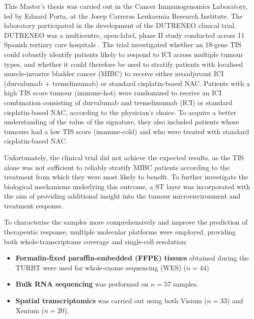 This Master's thesis was carried out in the Cancer Immunogenomics Laboratory, led by Eduard Porta, at the Josep Carreras Leukaemia Research Institute. The laboratory participated in the development of the DUTRENEO clinical trial\cite{Grande.et.al}. DUTRENEO was a multicentre, open-label, phase II study conducted across 11 Spanish tertiary care hospitals \cite{Grande.et.al}. The trial investigated whether an 18-gene TIS could robustly identify patients likely to respond to ICI across multiple tumour types, and whether it could therefore be used to stratify patients with localised muscle-invasive bladder cancer (MIBC) to receive either neoadjuvant ICI (durvalumab + tremelimumab) or standard cisplatin-based NAC. Patients with a high TIS score tumour (immune-hot) were randomized to receive an ICI combination consisting of durvalumab and tremelimumab (ICI) or standard cisplatin-based NAC, according to the physician's choice. To acquire a better understanding of the value of the signature, they also included patients whose tumours had a low TIS score (immune-cold) and who were treated with standard cisplatin-based NAC. 

Unfortunately, the clinical trial did not achieve the expected results, as the TIS alone was not sufficient to reliably stratify MIBC patients according to the treatment from which they were most likely to benefit. To further investigate the biological mechanisms underlying this outcome, a ST layer was incorporated with the aim of providing additional insight into the tumour microenvironment and treatment response.

To characterise the samples more comprehensively and improve the prediction of therapeutic response, multiple molecular platforms were employed, providing both whole-transcriptome coverage and single-cell resolution:

\begin{itemize}
	\item \textbf{Formalin-fixed paraffin-embedded (FFPE) tissues} obtained during the TURBT were used for whole-exome sequencing (WES) ($n = 44$)
	\item \textbf{Bulk RNA sequencing} was performed on $n = 57$ samples.
    \item \textbf{Spatial transcriptomics} was carried out using both Visium ($n = 33$) and Xenium ($n = 20$).
\end{itemize}

